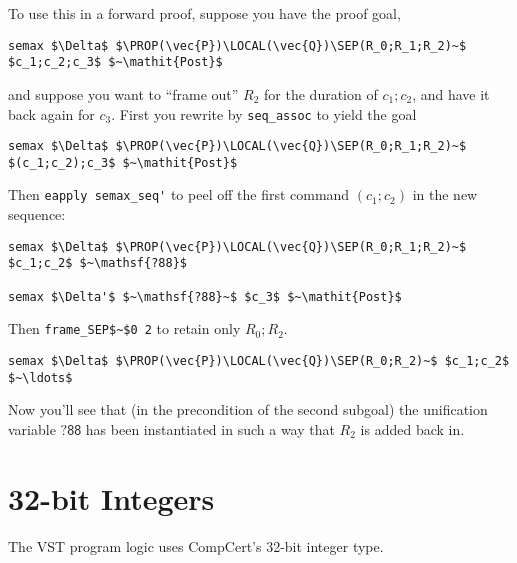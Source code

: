 \documentclass[12pt,fleqn,openany,oneside,showtrims]{memoir}
\newcommand{\ychapter}[2]{\chapter[#1]{#1}}
\begin{document}
To use this in a forward proof, suppose you have the
proof goal,
\begin{lstlisting}
semax $\Delta$ $\PROP(\vec{P})\LOCAL(\vec{Q})\SEP(R_0;R_1;R_2)~$ $c_1;c_2;c_3$ $~\mathit{Post}$
\end{lstlisting}
and suppose you want to ``frame out'' $R_2$ for the duration of
$c_1;c_2$, and have it back again for $c_3$.
First you rewrite by \lstinline{seq_assoc}
to yield the goal
\begin{lstlisting}
semax $\Delta$ $\PROP(\vec{P})\LOCAL(\vec{Q})\SEP(R_0;R_1;R_2)~$ $(c_1;c_2);c_3$ $~\mathit{Post}$
\end{lstlisting}
Then \lstinline{eapply semax_seq'} to peel off the
first command $(c_1;c_2)$ in the new sequence:
\begin{lstlisting}
semax $\Delta$ $\PROP(\vec{P})\LOCAL(\vec{Q})\SEP(R_0;R_1;R_2)~$ $c_1;c_2$ $~\mathsf{?88}$

semax $\Delta'$ $~\mathsf{?88}~$ $c_3$ $~\mathit{Post}$
\end{lstlisting}
Then \lstinline{frame_SEP$~$0 2} to retain only $R_0;R_2$.
\begin{lstlisting}
semax $\Delta$ $\PROP(\vec{P})\LOCAL(\vec{Q})\SEP(R_0;R_2)~$ $c_1;c_2$ $~\ldots$
\end{lstlisting}
Now you'll see that (in the precondition of the second subgoal)
the unification variable $\mathsf{?88}$ has been
instantiated in such a way that $R_2$ is added back in.

\ychapter{32-bit Integers}{(\file{compcert/lib/Integers.v})}
\label{refcard:32bit}

The VST program logic uses CompCert's 32-bit integer type.
\end{document}
